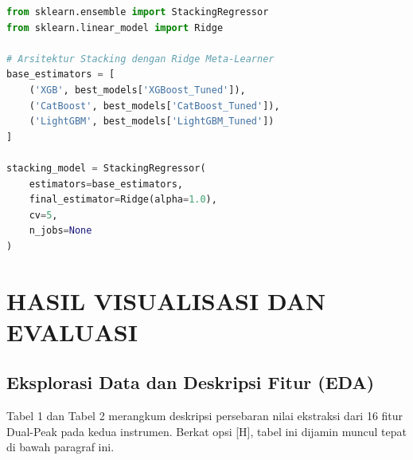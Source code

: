 \documentclass[10pt, twocolumn, a4paper]{article}
\begin{document}
\begin{lstlisting}[language=Python, caption=Arsitektur Stacking Regressor]
from sklearn.ensemble import StackingRegressor
from sklearn.linear_model import Ridge

# Arsitektur Stacking dengan Ridge Meta-Learner
base_estimators = [
    ('XGB', best_models['XGBoost_Tuned']),
    ('CatBoost', best_models['CatBoost_Tuned']),
    ('LightGBM', best_models['LightGBM_Tuned'])
]

stacking_model = StackingRegressor(
    estimators=base_estimators,
    final_estimator=Ridge(alpha=1.0),
    cv=5,
    n_jobs=None
)
\end{lstlisting}

\section{HASIL VISUALISASI DAN EVALUASI}

\subsection{Eksplorasi Data dan Deskripsi Fitur (EDA)}
Tabel 1 dan Tabel 2 merangkum deskripsi persebaran nilai ekstraksi dari 16 fitur Dual-Peak pada kedua instrumen. Berkat opsi [H], tabel ini dijamin muncul tepat di bawah paragraf ini.
\end{document}
